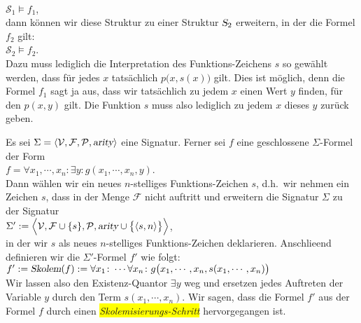 \\[0.2cm]
\hspace*{1.3cm}
$\mathcal{S}_1 \models f_1$,
\\[0.2cm]
dann k\"{o}nnen wir diese Struktur zu einer Struktur $\textsl{S}_2$ erweitern, in der die
Formel $f_2$ gilt:
\\[0.2cm]
\hspace*{1.3cm}
$\mathcal{S}_2 \models f_2$.
\\[0.2cm]
Dazu muss lediglich die Interpretation des Funktions-Zeichens $s$ so gew\"{a}hlt werden, dass
f\"{u}r jedes $x$ tats\"{a}chlich $p\bigl(x,s(x)\bigr)$ gilt.  Dies ist m\"{o}glich, denn die Formel
$f_1$ sagt ja aus, dass wir tats\"{a}chlich zu jedem $x$ einen Wert $y$ finden, f\"{u}r den
$p(x,y)$ gilt.   Die Funktion $s$ muss also lediglich zu jedem $x$ dieses $y$ zur\"{u}ck geben.



\begin{Definition}[Skolemisierung]
  Es sei $\Sigma = \langle \mathcal{V}, \mathcal{F}, \mathcal{P}, \textsl{arity} \rangle$
  eine Signatur.  Ferner sei $f$ eine geschlossene $\Sigma$-Formel der Form \\[0.2cm]
  \hspace*{1.3cm} 
  $f = \forall x_1, \cdots, x_n \colon \exists y \colon g(x_1, \cdots, x_n, y)$. \\[0.2cm]
  Dann w\"{a}hlen wir ein neues $n$-stelliges Funktions-Zeichen $s$, d.h.~wir nehmen ein Zeichen $s$, dass in
  der Menge $\mathcal{F}$ nicht auftritt und erweitern die Signatur $\Sigma$ zu der Signatur \\[0.2cm]
  \hspace*{1.3cm} 
  $\Sigma' := \Bigl\langle \mathcal{V}, \mathcal{F} \cup \{s\}, \mathcal{P}, \textsl{arity} \cup \bigl\{\pair(s,n)\bigr\} \Bigr\rangle$, \\[0.2cm]
  in der wir $s$ als neues $n$-stelliges Funktions-Zeichen deklarieren.  Anschlie\3end definieren wir die $\Sigma'$-Formel
  $f'$ wie folgt: \\[0.2cm]
  \hspace*{1.3cm} 
  $f' := \textsl{Skolem}(f) := 
  \forall x_1 \colon \cdots \forall x_n \colon g\bigl(x_1, \cdots, x_n, s(x_1,\cdots,x_n)\bigr)$
  \\[0.2cm]
  Wir lassen also den Existenz-Quantor $\exists y$ weg und ersetzen jedes Auftreten
  der Variable $y$ durch den Term $s(x_1,\cdots,x_n)$.  Wir sagen, dass die Formel $f'$ aus der Formel $f$
  durch einen \colorbox{yellow}{\emph{Skolemisierungs-Schritt}} hervorgegangen ist. 
  \eox
\end{Definition}

